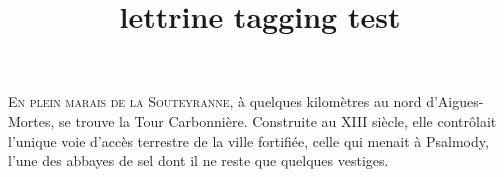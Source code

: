 \documentclass{article}
\title{lettrine tagging test}
\begin{document}
\lettrine{E}{n plein marais de la Souteyranne}, à quelques
  kilomètres au nord d'Aigues-Mortes, se trouve la Tour Carbonnière.
  Construite au XIII siècle, elle contrôlait l'unique voie d'accès
  terrestre de la ville fortifiée, celle qui menait à Psalmody,
  l'une des abbayes de sel dont il ne reste que quelques vestiges.
\end{document}
